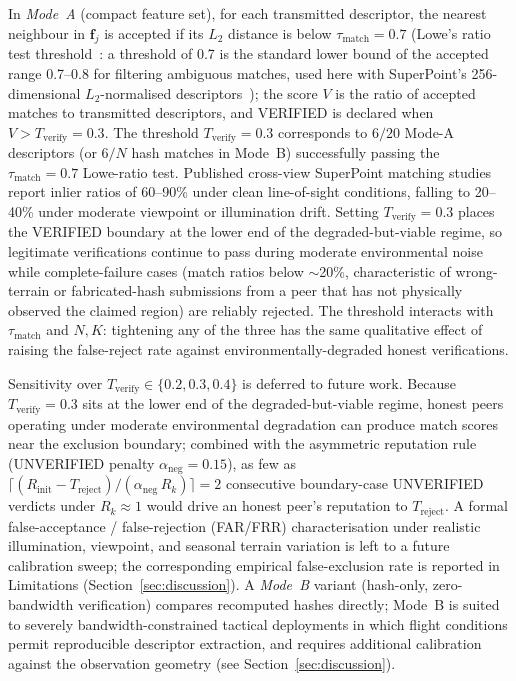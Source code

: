 \documentclass[journal,10pt,twocolumn]{IEEEtran}
\begin{document}
In \emph{Mode~A} (compact feature set), for each transmitted descriptor, the nearest neighbour in $\mathbf{f}_j$ is accepted if its $L_2$ distance is below $\tau_\text{match} = 0.7$ (Lowe's ratio test threshold~\cite{lowe2004distinctive}: a threshold of 0.7 is the standard lower bound of the accepted range 0.7--0.8 for filtering ambiguous matches, used here with SuperPoint's 256-dimensional $L_2$-normalised descriptors~\cite{detone2018superpoint}); the score $V$ is the ratio of accepted matches to transmitted descriptors, and VERIFIED is declared when $V > T_\text{verify} = 0.3$. The threshold $T_\text{verify}=0.3$ corresponds to $6/20$ Mode-A descriptors (or $6/N$ hash matches in Mode~B) successfully passing the $\tau_\text{match}=0.7$ Lowe-ratio test. Published cross-view SuperPoint matching studies report inlier ratios of 60--90\% under clean line-of-sight conditions, falling to 20--40\% under moderate viewpoint or illumination drift. Setting $T_\text{verify}=0.3$ places the VERIFIED boundary at the lower end of the degraded-but-viable regime, so legitimate verifications continue to pass during moderate environmental noise while complete-failure cases (match ratios below $\sim$20\%, characteristic of wrong-terrain or fabricated-hash submissions from a peer that has not physically observed the claimed region) are reliably rejected. The threshold interacts with $\tau_\text{match}$ and $N,K$: tightening any of the three has the same qualitative effect of raising the false-reject rate against environmentally-degraded honest verifications.

Sensitivity over $T_\text{verify}\in\{0.2, 0.3, 0.4\}$ is deferred to future work. Because $T_\text{verify}=0.3$ sits at the lower end of the degraded-but-viable regime, honest peers operating under moderate environmental degradation can produce match scores near the exclusion boundary; combined with the asymmetric reputation rule (UNVERIFIED penalty $\alpha_\text{neg}=0.15$), as few as $\lceil(R_\text{init}-T_\text{reject})/(\alpha_\text{neg}\, R_k)\rceil=2$ consecutive boundary-case UNVERIFIED verdicts under $R_k\!\approx\!1$ would drive an honest peer's reputation to $T_\text{reject}$. A formal false-acceptance / false-rejection (FAR/FRR) characterisation under realistic illumination, viewpoint, and seasonal terrain variation is left to a future calibration sweep; the corresponding empirical false-exclusion rate is reported in Limitations (Section~\ref{sec:discussion}). A \emph{Mode~B} variant (hash-only, zero-bandwidth verification) compares recomputed hashes directly; Mode~B is suited to severely bandwidth-constrained tactical deployments in which flight conditions permit reproducible descriptor extraction, and requires additional calibration against the observation geometry (see Section~\ref{sec:discussion}).
\end{document}
